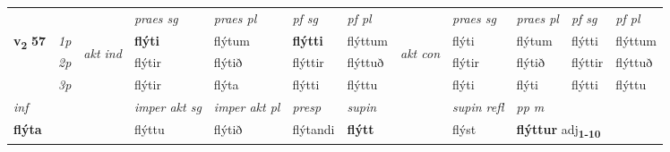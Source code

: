 \begin{longtable}[l]{X>{\footnotesize\itshape}llXXXXlXXXX}
 & &   & \textit{praes sg}  & \textit{praes pl}    & \textit{ pf sg} & \textit{pf pl} & & \textit{praes sg}  & \textit{praes pl}    & \textit{pf sg} & \textit{pf pl }  \\ \cmidrule{4-7} \cmidrule{9-12}
 \multirow{2}{*}{{{\textbf{v{\textsubscript{2}}} \Large{\textbf{57}}}}}  & 1p & \multirow{3}{*}{\begin{turn}{90}\textit{akt ind}\end{turn}} & \textbf{flýti} & flýtum & \textbf{flýtti} & flýttum & \multirow{3}{*}{\begin{turn}{90}\textit{akt con}\end{turn}} &flýti & flýtum & flýtti & flýttum\\*
 & 2p &  &  flýtir  & flýtið & flýttir & flýttuð & & flýtir & flýtið & flýttir & flýttuð \\*
 & 3p &  & flýtir & flýta & flýtti & flýttu & & flýti & flýti& flýtti & flýttu \\*
\cmidrule{4-7} \cmidrule{9-12}

   {\textit{inf}} & &  & \textit{imper akt sg} & \textit{imper akt pl}   & \textit{presp} & \textit{supin} && \textit{supin refl} & \textit{pp m} \\*
  {\textbf{flýta}} & && flýttu  & flýtið   & flýtandi &  \textbf{flýtt} && flýst & \multicolumn{2}{l}{\textbf{flýttur} adj\textbf{\textsubscript{1-10}}} \\*


\end{longtable}
